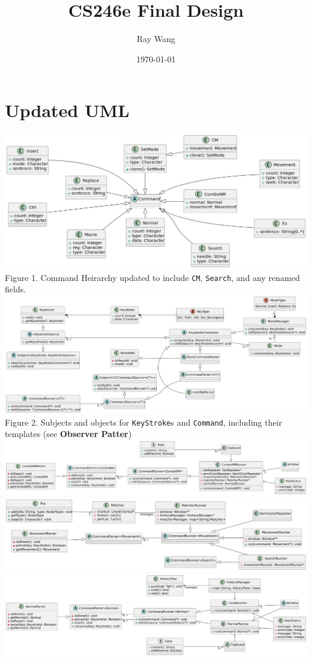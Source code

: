 \documentclass{article}
\title{CS246e Final Design}
\author{Ray Wang}
\date{\today}
\begin{document}
\section{Updated UML}
\includegraphics[width=\textwidth]{uml1}
Figure 1. Command Heirarchy updated to include \texttt{CM}, 
\texttt{Search}, and any renamed fields. 
\\\includegraphics[width=\textwidth]{uml2}
Figure 2. Subjects and objects for \texttt{KeyStroke}s and 
\texttt{Command}, including their templates (see \textbf{Observer Patter})
\\\includegraphics[width=\textwidth]{uml4}
\\\includegraphics[width=\textwidth]{uml3}
\\\includegraphics[width=\textwidth]{uml5}
\end{document}
